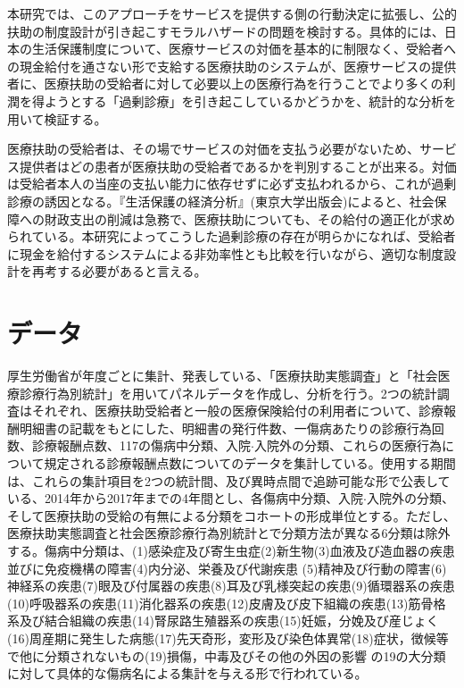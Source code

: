 \documentclass{jsarticle}[12pt]
\begin{document}
本研究では、このアプローチをサービスを提供する側の行動決定に拡張し、公的扶助の制度設計が引き起こすモラルハザードの問題を検討する。具体的には、日本の生活保護制度について、医療サービスの対価を基本的に制限なく、受給者への現金給付を通さない形で支給する医療扶助のシステムが、医療サービスの提供者に、医療扶助の受給者に対して必要以上の医療行為を行うことでより多くの利潤を得ようとする「過剰診療」を引き起こしているかどうかを、統計的な分析を用いて検証する。

医療扶助の受給者は、その場でサービスの対価を支払う必要がないため、サービス提供者はどの患者が医療扶助の受給者であるかを判別することが出来る。対価は受給者本人の当座の支払い能力に依存せずに必ず支払われるから、これが過剰診療の誘因となる。『生活保護の経済分析』(東京大学出版会)によると、社会保障への財政支出の削減は急務で、医療扶助についても、その給付の適正化が求められている。本研究によってこうした過剰診療の存在が明らかになれば、受給者に現金を給付するシステムによる非効率性とも比較を行いながら、適切な制度設計を再考する必要があると言える。


\section{データ}

厚生労働省が年度ごとに集計、発表している、「医療扶助実態調査」と「社会医療診療行為別統計」を用いてパネルデータを作成し、分析を行う。2つの統計調査はそれぞれ、医療扶助受給者と一般の医療保険給付の利用者について、診療報酬明細書の記載をもとにした、明細書の発行件数、一傷病あたりの診療行為回数、診療報酬点数、117の傷病中分類、入院$\cdot$入院外の分類、これらの医療行為について規定される診療報酬点数についてのデータを集計している。使用する期間は、これらの集計項目を2つの統計間、及び異時点間で追跡可能な形で公表している、2014年から2017年までの4年間とし、各傷病中分類、入院$\cdot$入院外の分類、そして医療扶助の受給の有無による分類をコホートの形成単位とする。ただし、医療扶助実態調査と社会医療診療行為別統計とで分類方法が異なる6分類は除外する。傷病中分類は、(1)感染症及び寄生虫症(2)新生物(3)血液及び造血器の疾患並びに免疫機構の障害(4)内分泌、栄養及び代謝疾患 (5)精神及び行動の障害(6)神経系の疾患(7)眼及び付属器の疾患(8)耳及び乳様突起の疾患(9)循環器系の疾患(10)呼吸器系の疾患(11)消化器系の疾患(12)皮膚及び皮下組織の疾患(13)筋骨格系及び結合組織の疾患(14)腎尿路生殖器系の疾患(15)妊娠，分娩及び産じょく(16)周産期に発生した病態(17)先天奇形，変形及び染色体異常(18)症状，徴候等で他に分類されないもの(19)損傷，中毒及びその他の外因の影響 の19の大分類に対して具体的な傷病名による集計を与える形で行われている。
\end{document}
